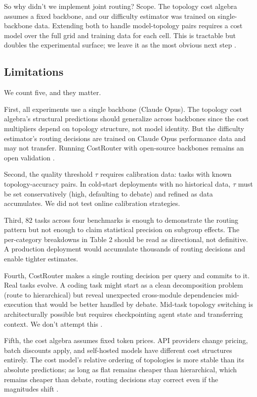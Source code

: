 So why didn't we implement joint routing? Scope. The topology cost algebra assumes a fixed backbone, and our difficulty estimator was trained on single-backbone data. Extending both to handle model-topology pairs requires a cost model over the full grid and training data for each cell. This is tractable but doubles the experimental surface; we leave it as the most obvious next step \cite{vsakota_2024}.

\subsection{Limitations}\label{limitations}\label{sec:limitations}

We count five, and they matter.

First, all experiments use a single backbone (Claude Opus). The topology cost algebra's structural predictions should generalize across backbones since the cost multipliers depend on topology structure, not model identity. But the difficulty estimator's routing decisions are trained on Claude Opus performance data and may not transfer. Running CostRouter with open-source backbones remains an open validation \cite{cemri_2025}.

Second, the quality threshold $\tau$ requires calibration data: tasks with known topology-accuracy pairs. In cold-start deployments with no historical data, $\tau$ must be set conservatively (high, defaulting to debate) and refined as data accumulates. We did not test online calibration strategies.

Third, 82 tasks across four benchmarks is enough to demonstrate the routing pattern but not enough to claim statistical precision on subgroup effects. The per-category breakdowns in Table 2 should be read as directional, not definitive. A production deployment would accumulate thousands of routing decisions and enable tighter estimates.

Fourth, CostRouter makes a single routing decision per query and commits to it. Real tasks evolve. A coding task might start as a clean decomposition problem (route to hierarchical) but reveal unexpected cross-module dependencies mid-execution that would be better handled by debate. Mid-task topology switching is architecturally possible but requires checkpointing agent state and transferring context. We don't attempt this \cite{kim_2024}.

Fifth, the cost algebra assumes fixed token prices. API providers change pricing, batch discounts apply, and self-hosted models have different cost structures entirely. The cost model's relative ordering of topologies is more stable than its absolute predictions; as long as flat remains cheaper than hierarchical, which remains cheaper than debate, routing decisions stay correct even if the magnitudes shift \cite{chen_2023_frugalgpt}.

